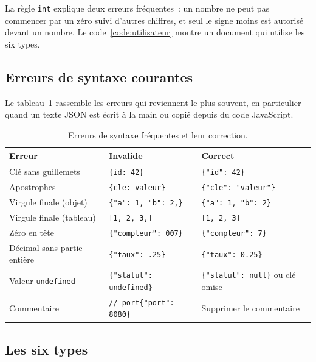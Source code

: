 \documentclass[12pt,a4paper]{article}
\newcommand{\exemple}[3][]{%
  \par\addvspace{6pt}\noindent\begin{minipage}{\linewidth}%
  \end{minipage}\par\addvspace{6pt}}
\begin{document}
La règle \texttt{int} explique deux erreurs fréquentes~: un nombre ne peut pas commencer par un zéro suivi d'autres chiffres, et seul le signe moins est autorisé devant un nombre. Le code~\ref{code:utilisateur} montre un document qui utilise les six types.

\exemple[language=json,label=code:utilisateur]{json/utilisateur.json}{Un document qui utilise les six types}

\subsection{Erreurs de syntaxe courantes}
Le tableau~\ref{tab:erreurs} rassemble les erreurs qui reviennent le plus souvent, en particulier quand un texte JSON est écrit à la main ou copié depuis du code JavaScript.

\begin{table}[H]
\centering
\small
\begin{tabularx}{\textwidth}{lXX}
\toprule
\textbf{Erreur} & \textbf{Invalide} & \textbf{Correct} \\
\midrule
Clé sans guillemets & \texttt{\{id: 42\}} & \texttt{\{"id": 42\}} \\
Apostrophes & \texttt{\{\textquotesingle{}cle\textquotesingle{}: \textquotesingle{}valeur\textquotesingle{}\}} & \texttt{\{"cle": "valeur"\}} \\
Virgule finale (objet) & \texttt{\{"a": 1, "b": 2,\}} & \texttt{\{"a": 1, "b": 2\}} \\
Virgule finale (tableau) & \texttt{[1, 2, 3,]} & \texttt{[1, 2, 3]} \\
Zéro en tête & \texttt{\{"compteur": 007\}} & \texttt{\{"compteur": 7\}} \\
Décimal sans partie entière & \texttt{\{"taux": .25\}} & \texttt{\{"taux": 0.25\}} \\
Valeur \texttt{undefined} & \texttt{\{"statut": undefined\}} & \texttt{\{"statut": null\}} ou clé omise \\
Commentaire & \texttt{// port}\newline\texttt{\{"port": 8080\}} & Supprimer le commentaire \\
\bottomrule
\end{tabularx}
\caption{Erreurs de syntaxe fréquentes et leur correction.}
\label{tab:erreurs}
\end{table}

\subsection{Les six types}
\label{sec:types}
\end{document}
